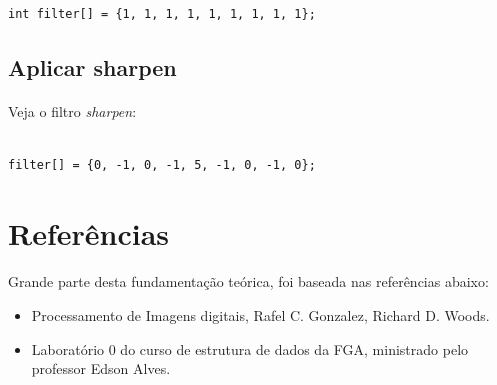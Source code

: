\documentclass[a4paper,10pt]{article}
\begin{document}
\begin{lstlisting}

int filter[] = {1, 1, 1, 1, 1, 1, 1, 1, 1};

\end{lstlisting}

\subsection{Aplicar sharpen}

\paragraph{}
Veja o filtro \textit{sharpen}:

\begin{lstlisting}

filter[] = {0, -1, 0, -1, 5, -1, 0, -1, 0};

\end{lstlisting}


\section{Referências}

\paragraph{}
Grande parte desta fundamentação teórica, foi baseada nas referências abaixo:

\begin{itemize}
  \item Processamento de Imagens digitais, Rafel C. Gonzalez, Richard D. Woods.
  \item Laboratório 0 do curso de estrutura de dados da FGA, ministrado pelo 
	professor Edson Alves.
\end{itemize}
\end{document}
